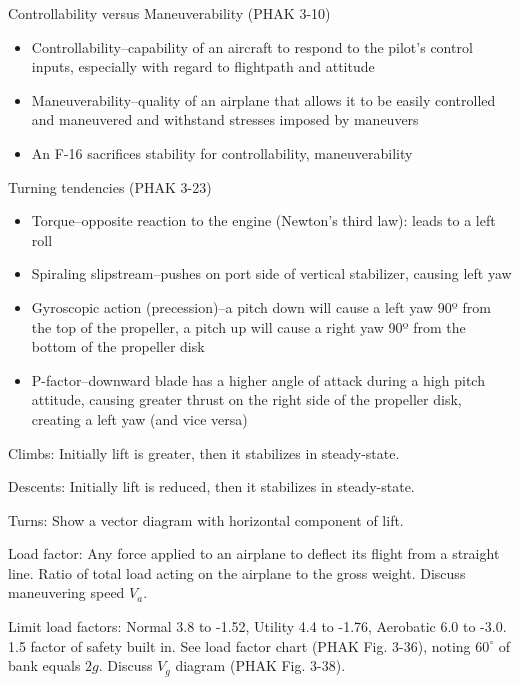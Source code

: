 \documentclass[twoside,openright]{report}
\begin{document}
Controllability versus Maneuverability (PHAK 3-10)

\begin{itemize}
  \item Controllability--capability of an aircraft to respond to the pilot’s
    control inputs, especially with regard to flightpath and attitude

  \item Maneuverability--quality of an airplane that allows it to be easily
    controlled and maneuvered and withstand stresses imposed by maneuvers

  \item An F-16 sacrifices stability for controllability, maneuverability
\end{itemize}

Turning tendencies (PHAK 3-23)

\begin{itemize}
  \item Torque--opposite reaction to the engine (Newton’s third law): leads to a
    left roll

  \item Spiraling slipstream--pushes on port side of vertical stabilizer,
    causing left yaw

  \item Gyroscopic action (precession)--a pitch down will cause a left yaw 90º
    from the top of the propeller, a pitch up will cause a right yaw 90º from
    the bottom of the propeller disk

  \item P-factor--downward blade has a higher angle of attack during a high
    pitch attitude, causing greater thrust on the right side of the propeller
    disk, creating a left yaw (and vice versa)
\end{itemize}

Climbs: Initially lift is greater, then it stabilizes in steady-state.

Descents: Initially lift is reduced, then it stabilizes in steady-state.

Turns: Show a vector diagram with horizontal component of lift.

Load factor: Any force applied to an airplane to deflect its flight from a
straight line. Ratio of total load acting on the airplane to the gross weight.
Discuss maneuvering speed $V_{a}$.

Limit load factors: Normal 3.8 to -1.52, Utility 4.4 to -1.76, Aerobatic 6.0 to
-3.0. 1.5 factor of safety built in. See load factor chart (PHAK Fig. 3-36),
noting $60^{\circ}$ of bank equals $2g$. Discuss $V_{g}$ diagram (PHAK Fig.
3-38).
\end{document}
